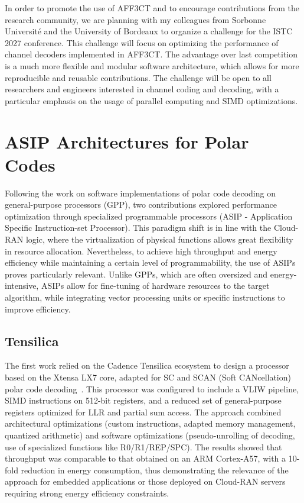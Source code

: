 \documentclass[11pt]{report}
\begin{document}
In order to promote the use of AFF3CT and to encourage contributions from the research community, we are planning with my colleagues from Sorbonne Université and the University of Bordeaux to organize a challenge for the ISTC 2027 conference. This challenge will focus on optimizing the performance of channel decoders implemented in AFF3CT. The advantage over last competition is a much more flexible and modular software architecture, which allows for more reproducible and reusable contributions. The challenge will be open to all researchers and engineers interested in channel coding and decoding, with a particular emphasis on the usage of parallel computing and SIMD optimizations.

\newpage
\section{ASIP Architectures for Polar Codes}
Following the work on software implementations of polar code decoding on general-purpose processors (GPP), two contributions explored performance optimization through specialized programmable processors (ASIP - Application Specific Instruction-set Processor). This paradigm shift is in line with the Cloud-RAN logic, where the virtualization of physical functions allows great flexibility in resource allocation. Nevertheless, to achieve high throughput and energy efficiency while maintaining a certain level of programmability, the use of ASIPs proves particularly relevant. Unlike GPPs, which are often oversized and energy-intensive, ASIPs allow for fine-tuning of hardware resources to the target algorithm, while integrating vector processing units or specific instructions to improve efficiency.

\subsection{Tensilica} The first work relied on the Cadence Tensilica ecosystem to design a processor based on the Xtensa LX7 core, adapted for SC and SCAN (Soft CANcellation) polar code decoding~\cite{leonardon:hal-03291077}. This processor was configured to include a VLIW pipeline, SIMD instructions on 512-bit registers, and a reduced set of general-purpose registers optimized for LLR and partial sum access. The approach combined architectural optimizations (custom instructions, adapted memory management, quantized arithmetic) and software optimizations (pseudo-unrolling of decoding, use of specialized functions like R0/R1/REP/SPC). The results showed that throughput was comparable to that obtained on an ARM Cortex-A57, with a 10-fold reduction in energy consumption, thus demonstrating the relevance of the approach for embedded applications or those deployed on Cloud-RAN servers requiring strong energy efficiency constraints.
\end{document}
